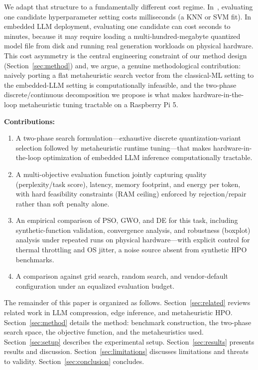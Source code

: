 \documentclass[journal]{IEEEtran}
\begin{document}
We adapt that structure to a fundamentally different cost regime. In~\cite{ref11}, evaluating one candidate hyperparameter setting costs milliseconds (a KNN or SVM fit). In embedded LLM deployment, evaluating one candidate can cost seconds to minutes, because it may require loading a multi-hundred-megabyte quantized model file from disk and running real generation workloads on physical hardware. This cost asymmetry is the central engineering constraint of our method design (Section~\ref{sec:method}) and, we argue, a genuine methodological contribution: naively porting a flat metaheuristic search vector from the classical-ML setting to the embedded-LLM setting is computationally infeasible, and the two-phase discrete/continuous decomposition we propose is what makes hardware-in-the-loop metaheuristic tuning tractable on a Raspberry Pi 5.

\textbf{Contributions:}
\begin{enumerate}
  \item A two-phase search formulation---exhaustive discrete quantization-variant selection followed by metaheuristic runtime tuning---that makes hardware-in-the-loop optimization of embedded LLM inference computationally tractable.
  \item A multi-objective evaluation function jointly capturing quality (perplexity/task score), latency, memory footprint, and energy per token, with hard feasibility constraints (RAM ceiling) enforced by rejection/repair rather than soft penalty alone.
  \item An empirical comparison of PSO, GWO, and DE for this task, including synthetic-function validation, convergence analysis, and robustness (boxplot) analysis under repeated runs on physical hardware---with explicit control for thermal throttling and OS jitter, a noise source absent from synthetic HPO benchmarks.
  \item A comparison against grid search, random search, and vendor-default configuration under an equalized evaluation budget.
\end{enumerate}

The remainder of this paper is organized as follows. Section~\ref{sec:related} reviews related work in LLM compression, edge inference, and metaheuristic HPO. Section~\ref{sec:method} details the method: benchmark construction, the two-phase search space, the objective function, and the metaheuristics used. Section~\ref{sec:setup} describes the experimental setup. Section~\ref{sec:results} presents results and discussion. Section~\ref{sec:limitations} discusses limitations and threats to validity. Section~\ref{sec:conclusion} concludes.
\end{document}
